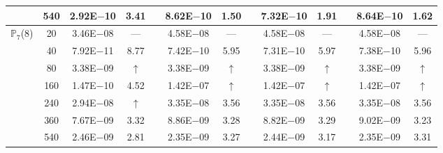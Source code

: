 \begin{table}[H]
{\begin{tabular}{@{}l c c c c c c c c c c c c@{}}
 & 540 & 2.92E$-$10 & 3.41  &  & 8.62E$-$10 & 1.50 &  & 7.32E$-$10 & 1.91 &  & 8.64E$-$10 & 1.62\\
\midrule
\multirow{7}{*}{$\mathbb{P}_{7}$(8)}
 & 20 & 3.46E$-$08 & ---  &  & 4.58E$-$08 & --- &  & 4.58E$-$08 & --- &  & 4.58E$-$08 & ---\\
 & 40 & 7.92E$-$11 & 8.77  &  & 7.42E$-$10 & 5.95 &  & 7.31E$-$10 & 5.97 &  & 7.38E$-$10 & 5.96\\
 & 80 & 3.38E$-$09 & $\uparrow$  &  & 3.38E$-$09 & $\uparrow$ &  & 3.38E$-$09 & $\uparrow$ &  & 3.38E$-$09 & $\uparrow$\\
 & 160 & 1.47E$-$10 & 4.52  &  & 1.42E$-$07 & $\uparrow$ &  & 1.42E$-$07 & $\uparrow$ &  & 1.42E$-$07 & $\uparrow$\\
 & 240 & 2.94E$-$08 & $\uparrow$  &  & 3.35E$-$08 & 3.56 &  & 3.35E$-$08 & 3.56 &  & 3.35E$-$08 & 3.56\\
 & 360 & 7.67E$-$09 & 3.32  &  & 8.86E$-$09 & 3.28 &  & 8.82E$-$09 & 3.29 &  & 9.02E$-$09 & 3.23\\
 & 540 & 2.46E$-$09 & 2.81  &  & 2.35E$-$09 & 3.27 &  & 2.44E$-$09 & 3.17 &  & 2.35E$-$09 & 3.31\\
\bottomrule
\end{tabular}}
\label{PRO:bending:02_02_glob2v2}
\end{table}
